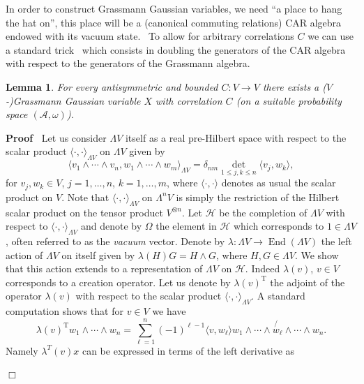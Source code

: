 \documentclass[11pt]{article}
\newcommand{\Tau}{\mathrm{T}}
\newcommand{\tmop}[1]{\ensuremath{\operatorname{#1}}}
\newcommand{\tmtextit}[1]{{\itshape{#1}}}
\newenvironment{proof}{\noindent\textbf{Proof\ }}{\hspace*{\fill}$\Box$\medskip}
\newtheorem{lemma}{Lemma}
\begin{document}
In order to construct Grassmann Gaussian variables, we need ``a place to hang
the hat on'', this place will be a (canonical commuting relations) CAR algebra
endowed with its vacuum state. \ To allow for arbitrary correlations $C$ we
can use a standard trick~{\cite{osterwalder_euclidean_1973-2}} which consists
in doubling the generators of the CAR algebra with respect to the generators
of the Grassmann algebra.

\begin{lemma}
  \label{lemma:existence-gaussian}For every antisymmetric and bounded $C : V
  \rightarrow V$ there exists a ($V$-)Grassmann Gaussian variable $X$ with
  correlation $C$ (on a suitable probability space $(\mathcal{A}, \omega)$).
\end{lemma}

\begin{proof}
  Let us consider $\Lambda V$ itself as a real pre-Hilbert space with respect
  to the scalar product $\langle \cdot, \cdot \rangle_{\Lambda V}$ on $\Lambda
  V$ given by
  \[ \langle v_1 \wedge \cdots \wedge v_n, w_1 \wedge \cdots \wedge w_m
     \rangle_{\Lambda V} = \delta_{n m} \underset{1 \leqslant j, k \leqslant
     n}{\det} \langle v_j, w_k \rangle, \]
  for $v_j, w_k \in V$, $j = 1, \ldots, n$, $k = 1, \ldots, m$, where $\langle
  \cdot, \cdot \rangle$ denotes as usual the scalar product on $V$. Note that
  $\langle \cdot, \cdot \rangle_{\Lambda V}$ on $\Lambda^n V$ is simply the
  restriction of the Hilbert scalar product on the tensor product $V^{\otimes
  n}$. Let $\mathcal{H}$ be the completion of $\Lambda V$ with respect to
  $\langle \cdot, \cdot \rangle_{\Lambda V}$ and denote by $\Omega$ the
  element in $\mathcal{H}$ which corresponds to $1 \in \Lambda V$, often
  referred to as the \tmtextit{vacuum} vector. Denote by $\lambda : \Lambda V
  \rightarrow \tmop{End} (\Lambda V)$ the left action of $\Lambda V$ on itself
  given by $\lambda (H) G = H \wedge G$, where $H, G \in \Lambda V$. We show
  that this action extends to a representation of $\Lambda V$ on
  $\mathcal{H}$. Indeed $\lambda (v)$, $v \in V$ corresponds to a creation
  operator. Let us denote by $\lambda (v)^{\Tau}$ the adjoint of the operator
  $\lambda (v)$ with respect to the scalar product $\langle \cdot, \cdot
  \rangle_{\Lambda V}$. A standard computation shows that for $v \in V$ we
  have
  \[ \lambda (v)^{\Tau} w_1 \wedge \cdots \wedge w_n = \sum_{\ell = 1}^n (-
     1)^{\ell - 1} \langle v, w_{\ell} \rangle w_1 \wedge \cdots \wedge
     \not{w_{\ell}} \wedge \cdots \wedge w_n . \]
  Namely $\lambda^T (v) x$ can be expressed in terms of the left derivative as

\end{proof}
\end{document}
